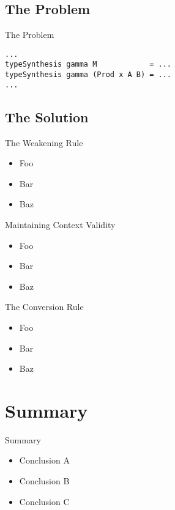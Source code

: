 \documentclass{beamer}
\begin{document}
\subsection{The Problem}

\begin{frame}[fragile]{The Problem}


  \smallskip

  \small{\begin{verbatim}
...
typeSynthesis gamma M            = ...
typeSynthesis gamma (Prod x A B) = ...
...
  \end{verbatim}}


\end{frame}


\subsection{The Solution}

\begin{frame}{The Weakening Rule}

  \begin{itemize}
    \item
      Foo
    \item
      Bar
    \item
      Baz
  \end{itemize}

\end{frame}


\begin{frame}{Maintaining Context Validity}

  \begin{itemize}
    \item
      Foo
    \item
      Bar
    \item
      Baz
  \end{itemize}

\end{frame}


\begin{frame}{The Conversion Rule}

  \begin{itemize}
    \item
      Foo
    \item
      Bar
    \item
      Baz
  \end{itemize}

\end{frame}


\section*{Summary}

\begin{frame}{Summary}

  \begin{itemize}
  \item
    Conclusion A
  \item
    Conclusion B
  \item
    Conclusion C
  \end{itemize}

\end{frame}
\end{document}
